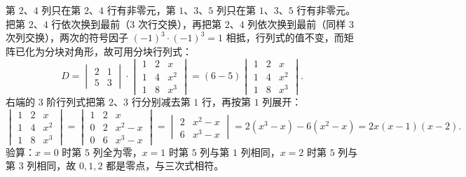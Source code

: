 
\begin{solution}
第 $2$、$4$ 列只在第 $2$、$4$ 行有非零元，第 $1$、$3$、$5$ 列只在第 $1$、$3$、$5$ 行有非零元。把第 $2$、$4$ 行依次换到最前（$3$ 次行交换），再把第 $2$、$4$ 列依次换到最前（同样 $3$ 次列交换），两次的符号因子 $(-1)^{3}\cdot(-1)^{3}=1$ 相抵，行列式的值不变，而矩阵已化为分块对角形，故可用分块行列式：
\[
D=\begin{vmatrix}2&1\\5&3\end{vmatrix}\cdot
\begin{vmatrix}1&2&x\\1&4&x^{2}\\1&8&x^{3}\end{vmatrix}
=(6-5)\begin{vmatrix}1&2&x\\1&4&x^{2}\\1&8&x^{3}\end{vmatrix}.
\]
右端的 $3$ 阶行列式把第 $2$、$3$ 行分别减去第 $1$ 行，再按第 $1$ 列展开：
\[
\begin{vmatrix}1&2&x\\1&4&x^{2}\\1&8&x^{3}\end{vmatrix}
=\begin{vmatrix}1&2&x\\0&2&x^{2}-x\\0&6&x^{3}-x\end{vmatrix}
=\begin{vmatrix}2&x^{2}-x\\6&x^{3}-x\end{vmatrix}
=2(x^{3}-x)-6(x^{2}-x)=2x(x-1)(x-2).
\]
验算：$x=0$ 时第 $5$ 列全为零，$x=1$ 时第 $5$ 列与第 $1$ 列相同，$x=2$ 时第 $5$ 列与第 $3$ 列相同，故 $0,1,2$ 都是零点，与三次式相符。
\end{solution}


